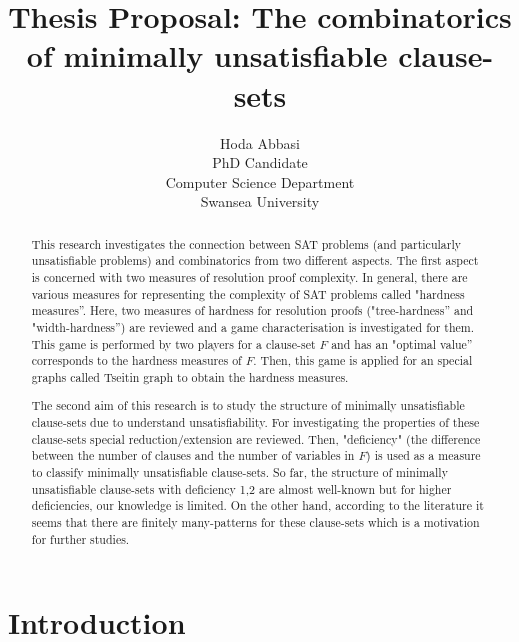 \documentclass{report}
\begin{document}
\title{Thesis Proposal: The combinatorics of minimally unsatisfiable clause-sets
       }

\author{Hoda Abbasi\\
        PhD Candidate\\
        Computer Science Department\\
        Swansea University\\}
\maketitle


\begin{abstract}
This research investigates the connection between SAT problems (and particularly unsatisfiable problems) and combinatorics from two different aspects. The first aspect is concerned with two measures of resolution proof complexity. In general, there are various measures for representing the complexity of SAT problems called "hardness measures''. Here, two measures of hardness for resolution proofs ("tree-hardness'' and "width-hardness'') are reviewed and a game characterisation is investigated for them. This game is performed by two players for a clause-set $F$ and has an "optimal value'' corresponds to the hardness measures of $F$. Then, this game is applied for an special graphs called Tseitin graph to obtain the hardness measures.

The second aim of this research is to study the structure of minimally unsatisfiable clause-sets due to understand unsatisfiability. For investigating the properties of these clause-sets special reduction/extension are reviewed. Then, "deficiency" (the difference between the number of clauses and the number of variables in $F$) is used as a measure to classify minimally unsatisfiable clause-sets. So far, the structure of minimally unsatisfiable clause-sets with deficiency 1,2 are almost well-known but for higher deficiencies, our knowledge is limited. On the other hand, according to the literature it seems that there are finitely many-patterns for these clause-sets which is a motivation for further studies.
\end{abstract}

\tableofcontents
\chapter{Introduction}
\label{cha:intro}
\end{document}
